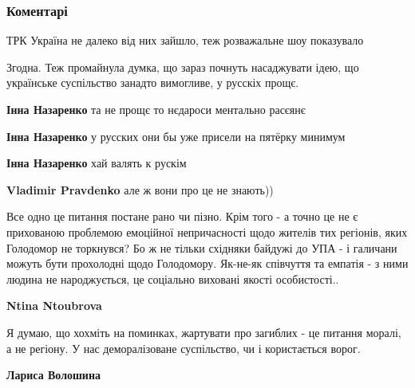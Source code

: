  
 
 
 
 
\subsubsection{Коментарі}
\label{sec:30_11_2021.fb.voloshyna_larysa.1.skandal_bloggery_golodomor.cmt}

\begin{itemize} %
ТРК Україна не далеко від них зайшло, теж розважальне шоу показувало

Згодна. Теж промайнула думка, що зараз почнуть насаджувати ідею, що українське суспільство занадто вимогливе, у русскіх прощє.

\begin{itemize} %
\textbf{Інна Назаренко} та не прощє то нєдароси ментально расєянє

\textbf{Інна Назаренко} у русских они бы уже присели на пятёрку минимум

\textbf{Інна Назаренко} хай валять к рускім

\textbf{Vladimir Pravdenko} але ж вони про це не знають))
\end{itemize} %


Все одно це питання постане рано чи пізно. Крім того - а точно це не є
прихованою проблемою емоційної непричасності щодо жителів тих регіонів, яких
Голодомор не торкнувся? Бо ж не тільки східняки байдужі до УПА - і галичани
можуть бути прохолодні щодо Голодомору. Як-не-як співчуття та емпатія - з ними
людина не народжується, це соціально виховані якості особистості..

\begin{itemize} %
\textbf{Ntina Ntoubrova} 

Я думаю, що хохміть на поминках, жартувати про загиблих - це питання моралі, а
не регіону. У нас деморалізоване суспільство, чи і користається ворог.

\textbf{Лариса Волошина} 


\end{itemize}
\end{itemize}
